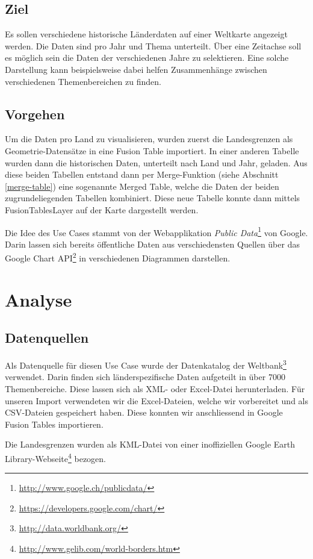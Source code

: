 \subsection{Ziel}
Es sollen verschiedene historische Länderdaten auf einer Weltkarte angezeigt werden. Die Daten sind pro Jahr und Thema unterteilt. Über eine Zeitachse soll es möglich sein die Daten der verschiedenen Jahre zu selektieren. Eine solche Darstellung kann beispielsweise dabei helfen Zusammenhänge zwischen verschiedenen Themenbereichen zu finden.

\subsection{Vorgehen}
\label{worlddata-vorgehen}
Um die Daten pro Land zu visualisieren, wurden zuerst die Landesgrenzen als Geometrie-Datensätze in eine Fusion Table importiert. In einer anderen Tabelle wurden dann die historischen Daten, unterteilt nach Land und Jahr, geladen. Aus diese beiden Tabellen entstand dann per \gls{Merge}-Funktion (siehe Abschnitt \ref{merge-table}) eine sogenannte Merged Table, welche die Daten der beiden zugrundeliegenden Tabellen kombiniert. Diese neue Tabelle konnte dann mittels FusionTablesLayer auf der Karte dargestellt werden.

Die Idee des Use Cases stammt von der Webapplikation \emph{Public Data}\footnote{\url{http://www.google.ch/publicdata/}} von Google. Darin lassen sich bereits öffentliche Daten aus verschiedensten Quellen über das Google Chart \gls{API}\footnote{\url{https://developers.google.com/chart/}} in verschiedenen Diagrammen darstellen.

\section{Analyse}
\subsection{Datenquellen}
Als Datenquelle für diesen Use Case wurde der Datenkatalog der Weltbank\footnote{\url{http://data.worldbank.org/}} verwendet. Darin finden sich länderspezifische Daten aufgeteilt in über 7000 Themenbereiche. Diese lassen sich als \gls{XML}- oder Excel-Datei herunterladen. Für unseren Import verwendeten wir die Excel-Dateien, welche wir vorbereitet und als \gls{CSV}-Dateien gespeichert haben. Diese konnten wir anschliessend in Google Fusion Tables importieren.

Die Landesgrenzen wurden als \gls{KML}-Datei von einer inoffiziellen Google Earth Library-Webseite\footnote{\url{http://www.gelib.com/world-borders.htm}} bezogen. 

